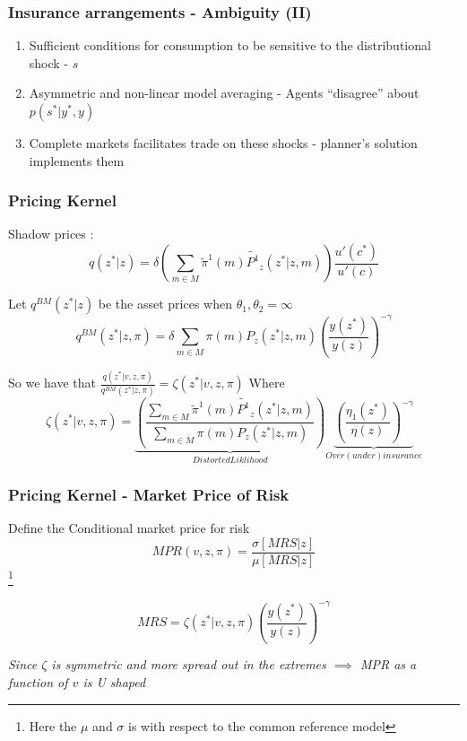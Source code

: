 \documentclass{beamer}
\theoremstyle{definition}
\begin{document}
\begin{frame}
\frametitle{Insurance arrangements - Ambiguity (II)}
\begin{enumerate}
	\item Sufficient conditions for  consumption to be sensitive to the distributional shock - $s$
	\item Asymmetric and non-linear model averaging  - Agents ``disagree'' about $p(s^*|y^*,y)$
	\item Complete markets  facilitates trade on these shocks  - planner's solution implements them
\end{enumerate}
\end{frame}

\begin{frame}
\frametitle{Pricing Kernel}
Shadow prices :
\[q(z^* |z )=\delta \left(\sum_{m \in M}\tilde{\pi}^1(m)\tilde{P^1}_z(z^* |z,m)\right)\frac{ u'(c^*)}{u'(c)}\]

Let $q^{BM}(z^*|z)$ be the asset prices when $\theta_1,\theta_2=\infty$
\[q^{BM}(z^*|z,\pi) = \delta \sum_{m \in M}{\pi(m)P_{z}(z^*|z,m)} \left(\frac{y(z^*)}{y(z)}\right)^{-\gamma}\]

So we have that $\frac{q(z^*|v,z,\pi)}{q^{BM}(z^*|z,\pi)}=\zeta(z^*|v,z,\pi)$
Where 
\[\zeta(z^*|v,z,\pi)=\underbrace{\left(\frac{\sum_{m \in M}\tilde{\pi}^{1}(m)\tilde{P^1}_z(z^* |z,m)}{\sum_{m \in M}{\pi(m)P_{z}(z^*|z,m)}} \right)}_{Distorted Liklihood} \underbrace{\left(\frac{\eta_1(z^*)}{\eta(z)}\right)^{-\gamma}}_{Over (under) insurance} \]
\end{frame}


\begin{frame}
\frametitle{Pricing Kernel - Market Price of Risk}

Define the Conditional market price for risk 
\[MPR(v,z,\pi)=\frac{\sigma[MRS|z]}{\mu[MRS|z]}\] \footnote{Here the $\mu$ and $\sigma$ is with respect to the common reference model}

\[MRS=\zeta(z^*|v,z,\pi)\left(\frac{y(z^*)}{y(z)}\right)^{-\gamma}\]

\vspace{2mm}
\emph{Since $\zeta$ is symmetric and more spread out in the extremes  $\implies$ MPR as a function of $v$ is U shaped}

\end{frame}
\end{document}
